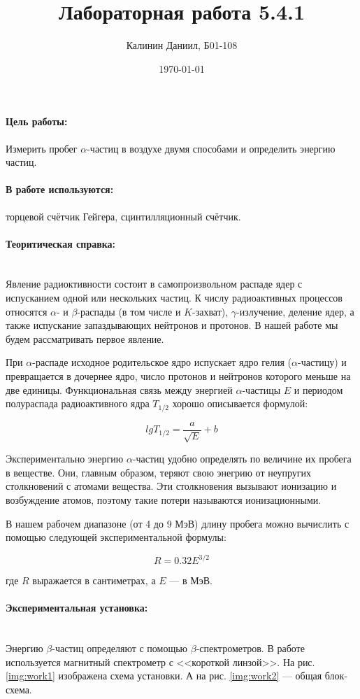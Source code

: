 \documentclass[a4paper, 12pt]{article}
\author{Калинин Даниил, Б01-108}
\date{\today}
\title{Лабораторная работа 5.4.1}
\newcommand{\parag}[1]{\paragraph*{#1:}}
\begin{document}
\maketitle
\parindent=0cm

\parag {Цель работы}
Измерить пробег $\alpha$-частиц в воздухе двумя способами и определить энергию частиц.

\parag {В работе используются}
торцевой счётчик Гейгера, сцинтилляционный счётчик.

\parag {Теоритическая справка} ~\\

Явление радиоктивности состоит в самопроизвольном распаде ядер с испусканием одной или нескольких частиц. К числу радиоактивных процессов относятся $\alpha$- и $\beta$-распады (в том числе и $K$-захват), $\gamma$-излучение, деление ядер, а также испускание запаздывающих нейтронов и протонов. В нашей работе мы будем рассматривать первое явление.

При $\alpha$-распаде исходное родительское ядро испускает ядро гелия ($\alpha$-частицу) и превращается в дочернее ядро, число протонов и нейтронов которого меньше на две единицы. Функциональная связь между энергией $\alpha$-частицы $E$ и периодом полураспада радиоактивного ядра $T_{1/2}$ хорошо описывается формулой:

\begin{equation}
    lg T_{1/2} = \frac{a}{\sqrt{E}} + b
\end{equation}

Экспериментально энергию $\alpha$-частиц удобно определять по величине их пробега в веществе. Они, главным образом, теряют свою энегрию от неупругих столкновений с атомами вещества. Эти столкновения вызывают ионизацию и возбуждение атомов, поэтому такие потери называются ионизационными. 

В нашем рабочем диапазоне (от 4 до 9 МэВ) длину пробега можно вычислить с помощью следующей экспериментальной формулы:

\begin{equation}
    R = 0.32 E^{3/2}
    \label{eq:sc}
\end{equation}

где $R$ выражается в сантиметрах, а $E$ --- в МэВ.

\parag {Экспериментальная установка}~\\

Энергию $\beta$-частиц определяют с помощью $\beta$-спектрометров. В работе используется магнитный спектрометр с <<короткой линзой>>. На рис. \ref{img:work1} изображена схема установки. А на рис. \ref{img:work2} --- общая блок-схема.
\end{document}
